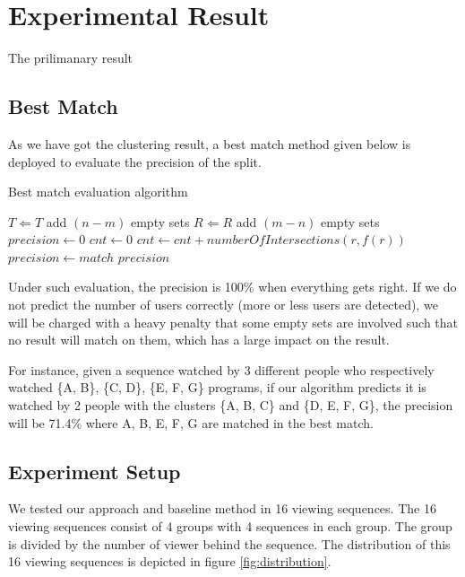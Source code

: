 \section{Experimental Result}
The prilimanary result

\subsection{Best Match}
As we have got the clustering result, a best match method given below is
deployed to evaluate the precision of the split.

\begin{algorithm}[H]
\caption{Best match evaluation algorithm}
\label{best_match}
\begin{algorithmic}[1]
        \STATE $T \Leftarrow T$ add $(n-m)$ empty sets
\ELSE
        \STATE $R \Leftarrow R$ add $(m-n)$ empty sets
\ENDIF
\STATE $precision \leftarrow 0$
        \STATE $cnt \leftarrow 0$
                \STATE $cnt \leftarrow cnt + numberOfIntersections(r, f(r))$
        \ENDFOR
                \STATE $precision \leftarrow match$
        \ENDIF
\ENDFOR
\RETURN $precision$
\end{algorithmic}
\end{algorithm}

Under such evaluation, the precision is 100\% when everything gets right. If we do not predict the
number of users correctly (more or less users are detected), we will be charged with a heavy penalty
that some empty sets are involved such that no result will match on them, which has a large impact on
the result.

For instance, given a sequence watched by 3 different people who respectively watched \{A, B\}, \{C, D\}, \{E, F, G\} programs,
if our algorithm predicts it is watched by 2 people with the clusters \{A, B, C\} and \{D, E, F, G\}, the precision will be
71.4\% where A, B, E, F, G are matched in the best match.

\subsection{Experiment Setup}
We tested our approach and baseline method in 16 viewing sequences. The 16 viewing sequences consist of 4 groups with 4 sequences in each group.
The group is divided by the number of viewer behind the sequence. The distribution of this 16 viewing sequences is depicted in figure \ref{fig:distribution}.

